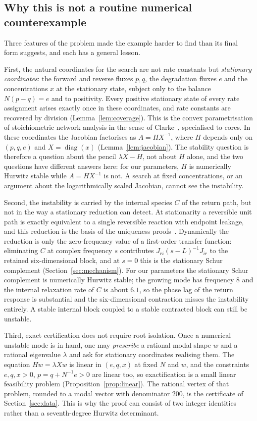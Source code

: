 \documentclass[11pt,a4paper]{article}
\theoremstyle{plain}
\theoremstyle{definition}
\theoremstyle{remark}
\numberwithin{equation}{section}
\newcommand{\diag}{\operatorname{diag}}
\begin{document}
\subsection*{Why this is not a routine numerical counterexample}
Three features of the problem made the example harder to find than its final form suggests, and each has a general lesson.

First, the natural coordinates for the search are not rate constants but \emph{stationary coordinates}: the forward and reverse fluxes $p,q$, the degradation fluxes $e$ and the concentrations $x$ at the stationary state, subject only to the balance $N(p-q)=e$ and to positivity. Every positive stationary state of every rate assignment arises exactly once in these coordinates, and rate constants are recovered by division (Lemma~\ref{lem:coverage}). This is the convex parametrisation of stoichiometric network analysis in the sense of Clarke~\cite{Clarke1980}, specialised to cores. In these coordinates the Jacobian factorises as $A=HX^{-1}$, where $H$ depends only on $(p,q,e)$ and $X=\diag(x)$ (Lemma~\ref{lem:jacobian}). The stability question is therefore a question about the pencil $\lambda X-H$, not about $H$ alone, and the two questions have different answers here: for our parameters, $H$ is numerically Hurwitz stable while $A=HX^{-1}$ is not. A search at fixed concentrations, or an argument about the logarithmically scaled Jacobian, cannot see the instability.

Second, the instability is carried by the internal species $C$ of the return path, but not in the way a stationary reduction can detect. At stationarity a reversible unit path is exactly equivalent to a single reversible reaction with endpoint leakage, and this reduction is the basis of the uniqueness proofs~\cite{TypeIIpos,TypeIImixed}. Dynamically the reduction is only the zero-frequency value of a first-order transfer function: eliminating $C$ at complex frequency $s$ contributes $J_{ri}(s-L)^{-1}J_{ir}$ to the retained six-dimensional block, and at $s=0$ this is the stationary Schur complement (Section~\ref{sec:mechanism}). For our parameters the stationary Schur complement is numerically Hurwitz stable; the growing mode has frequency $8$ and the internal relaxation rate of $C$ is about $6.1$, so the phase lag of the return response is substantial and the six-dimensional contraction misses the instability entirely. A stable internal block coupled to a stable contracted block can still be unstable.

Third, exact certification does not require root isolation. Once a numerical unstable mode is in hand, one may \emph{prescribe} a rational modal shape $w$ and a rational eigenvalue $\lambda$ and ask for stationary coordinates realising them. The equation $Hw=\lambda Xw$ is linear in $(e,q,x)$ at fixed $N$ and $w$, and the constraints $e,q,x>0$, $p=q+N^{-1}e>0$ are linear too, so exactification is a small linear feasibility problem (Proposition~\ref{prop:linear}). The rational vertex of that problem, rounded to a modal vector with denominator $200$, is the certificate of Section~\ref{sec:data}. This is why the proof can consist of two integer identities rather than a seventh-degree Hurwitz determinant.
\end{document}
